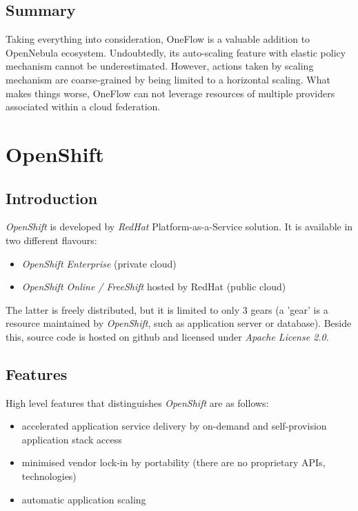 \subsection{Summary}
Taking everything into consideration, OneFlow is a valuable addition to OpenNebula ecosystem. Undoubtedly, its auto-scaling feature with elastic policy mechanism cannot be underestimated. However, actions taken by scaling mechanism are coarse-grained by being limited to a horizontal scaling. What makes things worse, OneFlow can not leverage resources of multiple providers associated within a cloud federation.

\section{OpenShift}

\subsection{Introduction}
\emph{OpenShift} is developed by \emph{RedHat} Platform-as-a-Service solution. It is available in two different flavours:
\begin{itemize}
 \item \emph{OpenShift Enterprise} (private cloud)
 \item \emph{OpenShift Online / FreeShift} hosted by RedHat (public cloud)
\end{itemize}

The latter is freely distributed, but it is limited to only 3 gears (a 'gear' is a resource maintained by \emph{OpenShift}, such as application server or database). Beside this, source code is hosted on github and licensed under \emph{Apache License 2.0}.

\subsection{Features}
High level features that distinguishes \emph{OpenShift} are as follows:
\begin{itemize}
  \item accelerated application service delivery by on-demand and self-provision application stack access
  \item minimised vendor lock-in by portability (there are no proprietary APIs, technologies)
  \item automatic application scaling
\end{itemize}

